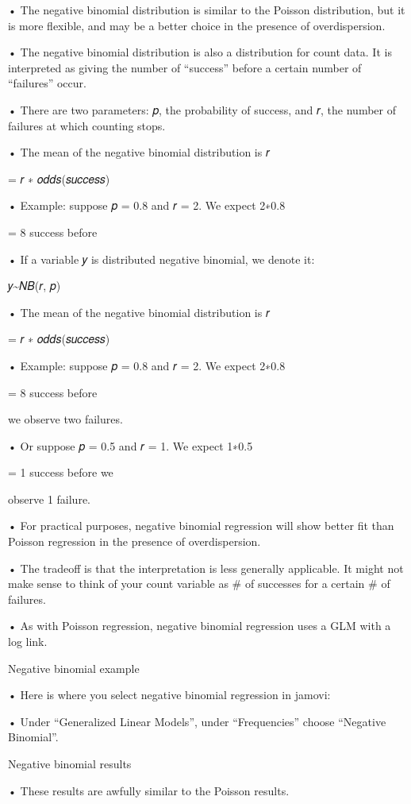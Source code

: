 \documentclass[
  letterpaper,
  DIV=11,
  numbers=noendperiod]{scrreprt}
\begin{document}
• The negative binomial distribution is similar to the Poisson
distribution, but it is more flexible, and may be a better choice in the
presence of overdispersion.

• The negative binomial distribution is also a distribution for count
data. It is interpreted as giving the number of ``success'' before a
certain number of ``failures'' occur.

• There are two parameters: 𝑝, the probability of success, and 𝑟, the
number of failures at which counting stops.

• The mean of the negative binomial distribution is 𝑟

= 𝑟 ∗ 𝑜𝑑𝑑𝑠(𝑠𝑢𝑐𝑐𝑒𝑠𝑠)

• Example: suppose 𝑝 = 0.8 and 𝑟 = 2. We expect 2∗0.8

= 8 success before

• If a variable 𝑦 is distributed negative binomial, we denote it:

𝑦\textasciitilde 𝑁𝐵(𝑟, 𝑝)

• The mean of the negative binomial distribution is 𝑟

= 𝑟 ∗ 𝑜𝑑𝑑𝑠(𝑠𝑢𝑐𝑐𝑒𝑠𝑠)

• Example: suppose 𝑝 = 0.8 and 𝑟 = 2. We expect 2∗0.8

= 8 success before

we observe two failures.

• Or suppose 𝑝 = 0.5 and 𝑟 = 1. We expect 1∗0.5

= 1 success before we

observe 1 failure.

• For practical purposes, negative binomial regression will show better
fit than Poisson regression in the presence of overdispersion.

• The tradeoff is that the interpretation is less generally applicable.
It might not make sense to think of your count variable as \# of
successes for a certain \# of failures.

• As with Poisson regression, negative binomial regression uses a GLM
with a log link.

Negative binomial example

• Here is where you select negative binomial regression in jamovi:

• Under ``Generalized Linear Models'', under ``Frequencies'' choose
``Negative Binomial''.

Negative binomial results

• These results are awfully similar to the Poisson results.
\end{document}
